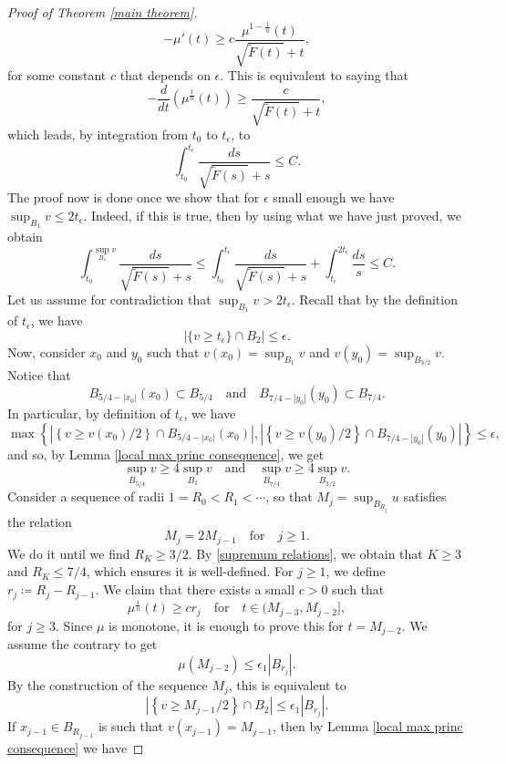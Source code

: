\documentclass[12pt,a4paper]{amsart}
\numberwithin{equation}{section} %
\theoremstyle{definition}
\theoremstyle{remark}
\begin{document}
\begin{proof}[Proof of Theorem \ref{main theorem}]
$$
    -\mu'(t) \geq c \frac{\mu^{1 - \frac{1}{n}}(t)}{\sqrt{\tilde{F}(t)}+t},
$$
for some constant $c$ that depends on $\epsilon$. This is equivalent to saying that
$$
    -\frac{d}{dt}\left(\mu^{\frac{1}{n}}(t) \right) \geq \frac{c}{\sqrt{\tilde{F}(t)}+t},
$$
which leads, by integration from $t_0$ to $t_\epsilon$, to
$$
    \int_{t_0}^{t_\epsilon} \frac{ds}{\sqrt{\tilde{F}(s)}+s} \leq C.
$$
The proof now is done once we show that for $\epsilon$ small enough we have $\sup_{B_1}v \leq 2t_\epsilon$. Indeed, if this is true, then by using what we have just proved, we obtain
$$
    \int_{t_0}^{\sup_{B_1} v} \frac{ds}{\sqrt{\tilde{F}(s)}+s} \leq \int_{t_0}^{t_\epsilon} \frac{ds}{\sqrt{\tilde{F}(s)}+s} + \int_{t_\epsilon}^{2t_\epsilon} \frac{ds}{s} \leq C.
$$
Let us assume for contradiction that $\sup_{B_1} v > 2t_\epsilon$. Recall that by the definition of $t_\epsilon$, we have
$$
    |\{v \geq t_\epsilon\} \cap B_2| \leq \epsilon.
$$
Now, consider $x_0$ and $y_0$ such that $v(x_0) = \sup_{B_1} v$ and $v(y_0) = \sup_{B_{3/2}}v$. Notice that
$$
    B_{5/4 - |x_0|}(x_0) \subset B_{5/4} \quad \text{and} \quad B_{7/4 - |y_0|}(y_0) \subset B_{7/4}.
$$
In particular, by definition of $t_\epsilon$, we have
$$
\max\left\{\left|\left\{v \geq v(x_0)/2 \right\}\cap B_{5/4 - |x_0|}(x_0)\right|, \left|\left\{v \geq v(y_0)/2 \right\}\cap B_{7/4 - |y_0|}(y_0)\right|\right\} \leq \epsilon,
$$
and so, by Lemma \ref{local max princ consequence}, we get
\begin{equation}\label{supremum relations}
    \sup_{B_{5/4}}v \geq 4\sup_{B_1}v \quad \text{and} \quad \sup_{B_{7/4}}v \geq 4\sup_{B_{3/2}}v.
\end{equation}
Consider a sequence of radii $1 = R_0 < R_1 < \cdots $, so that $M_j = \sup_{B_{R_j}}u$ satisfies the relation
$$
    M_j = 2M_{j-1} \quad \text{for} \quad j \geq 1.
$$
We do it until we find $R_K \geq 3/2$. By \eqref{supremum relations}, we obtain that $K\ge3$ and $R_K \leq 7/4$, which ensures it is well-defined. For $j \geq 1$, we define $r_j \coloneqq R_j - R_{j-1}$. We claim that there exists a small $c>0$ such that
$$
    \mu^{\frac{1}{n}}(t) \geq c r_j \quad \text{for} \quad t \in (M_{j-3},M_{j-2}],
$$
for $j \geq 3$. Since $\mu$ is monotone, it is enough to prove this for $t = M_{j-2}$. We assume the contrary to get
$$
    \mu\left(M_{j-2}\right) \leq \epsilon_1 \left|B_{r_j}\right|.
$$
By the construction of the sequence $M_j$, this is equivalent to
$$
    \left|\left\{v \geq M_{j-1}/2 \right\}\cap B_2\right| \leq \epsilon_1 \left|B_{r_j}\right|.
$$
If $x_{j-1} \in B_{R_{j-1}}$ is such that $v\left(x_{j-1}\right) = M_{j-1}$, then by Lemma \ref{local max princ consequence} we have

\end{proof}
\end{document}
